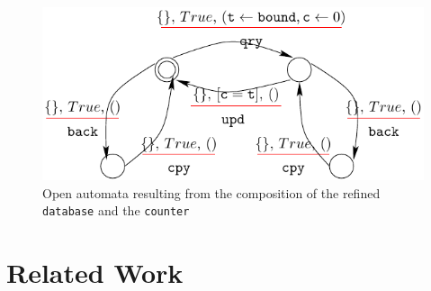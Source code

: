 \documentclass[runningheads]{llncs}
\begin{document}
\begin{figure}[h]
 \centering
   \includegraphics[width=.6\textwidth]{Figures/composeRefined.pdf}
   \caption{Open automata resulting from the composition of the  refined  \texttt{database} and the \texttt{counter} \label{Fig:ComposeRefine}}
\end{figure}






%
%
%
%


\section{Related Work}
\label{sec:sota}
\end{document}

